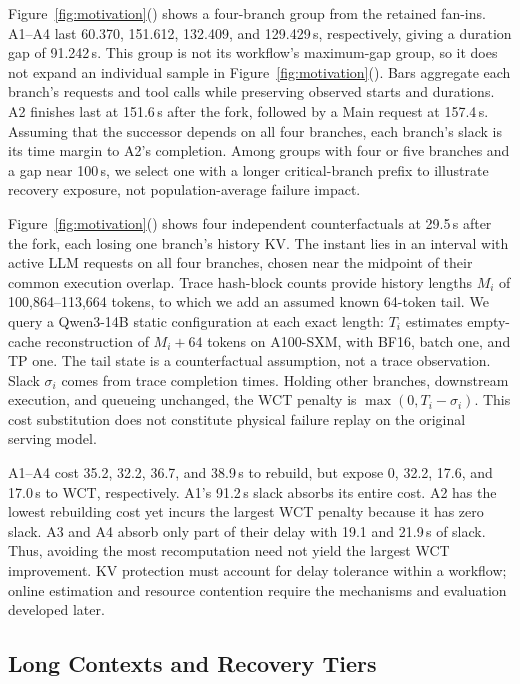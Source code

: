 Figure~\ref{fig:motivation}() shows a
four-branch group from the retained fan-ins. A1--A4 last 60.370, 151.612,
132.409, and 129.429\,s, respectively, giving a duration gap of 91.242\,s.
This group is not its workflow's maximum-gap group, so it does not expand
an individual sample in Figure~\ref{fig:motivation}().
Bars aggregate each branch's requests and tool calls while preserving
observed starts and durations. A2 finishes last at 151.6\,s after the
fork, followed by a Main request at 157.4\,s. Assuming that the successor
depends on all four branches, each branch's slack is its time margin to
A2's completion. Among groups with four or five branches and a gap near
100\,s, we select one with a longer critical-branch prefix to illustrate
recovery exposure, not population-average failure impact.

Figure~\ref{fig:motivation}() shows
four independent counterfactuals at 29.5\,s after the fork, each losing
one branch's history KV. The instant lies in an interval with active LLM
requests on all four branches, chosen near the midpoint of their common
execution overlap. Trace hash-block counts provide history lengths
$M_i$ of 100,864--113,664 tokens, to which we add an assumed known
64-token tail. We query a Qwen3-14B static configuration at each exact
length: $T_i$ estimates
empty-cache reconstruction of $M_i+64$ tokens on A100-SXM, with BF16,
batch one, and TP one. The tail state is a counterfactual assumption,
not a trace observation. Slack $\sigma_i$ comes from trace completion
times. Holding other branches, downstream execution, and queueing
unchanged, the WCT penalty is $\max(0,T_i-\sigma_i)$.
This cost substitution does not constitute physical failure replay on
the original serving model.

A1--A4 cost 35.2, 32.2, 36.7, and 38.9\,s to rebuild, but expose
0, 32.2, 17.6, and 17.0\,s to WCT, respectively. A1's 91.2\,s slack
absorbs its entire cost. A2 has the lowest rebuilding cost yet incurs
the largest WCT penalty because it has zero slack. A3 and A4 absorb
only part of their delay with 19.1 and 21.9\,s of slack. Thus, avoiding
the most recomputation need not yield the largest WCT improvement.
KV protection must account for delay tolerance within a workflow;
online estimation and resource contention require the mechanisms and
evaluation developed later.

\subsection{Long Contexts and Recovery Tiers}
\label{sec:motivation-long-context}

